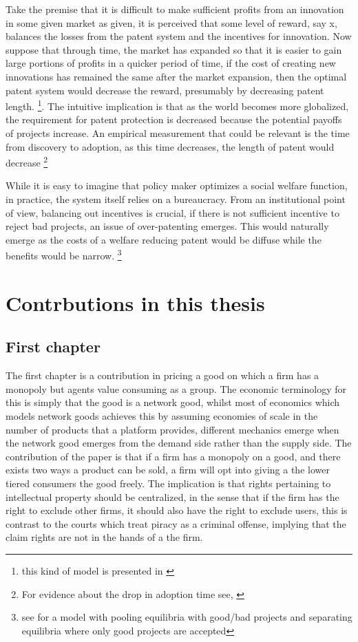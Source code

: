 \documentclass[12pt]{article}
\numberwithin{equation}{section}
\begin{document}
Take the premise that it is difficult to make sufficient profits from an innovation in some given market as given, it is perceived that some level of reward, say x, balances the losses from the patent system and the incentives for innovation. Now suppose that through time, the market has expanded so that it is easier to gain large portions of profits in a quicker period of time, if the cost of creating new innovations has remained the same after the market expansion, then the optimal patent system would decrease the reward, presumably by decreasing patent length. \footnote{this kind of model is presented in \cite{boldrin2009market} }. The intuitive implication is that as the world becomes more globalized, the requirement for patent protection is decreased because the potential payoffs of projects increase. An empirical measurement that could be relevant is the time from discovery to adoption, as this time decreases, the length of patent would decrease \footnote{For evidence about the drop in adoption time see, \cite{comin2006five}}

While it is easy to imagine that policy maker optimizes a social welfare function, in practice, the system itself relies on a bureaucracy. From an institutional point of view, balancing out incentives is crucial, if there is not sufficient incentive to reject bad projects, an issue of over-patenting emerges. This would naturally emerge as the costs of a welfare reducing patent would be diffuse while the benefits would be narrow. \footnote{see \cite{Caillaud2012} for a model with pooling equilibria with good/bad projects and separating equilibria where only good projects are accepted}

\section{Contrbutions in this thesis}

\subsection{First chapter}

The first chapter is a contribution in pricing a good on which a firm has a monopoly but agents value consuming as a group. The economic terminology for this is simply that the good is a network good, whilst most of economics which models network goods achieves this by assuming economies of scale in the number of products that a platform provides, different mechanics emerge when the network good emerges from the demand side rather than the supply side. The contribution of the paper is that if a firm has a monopoly on a good, and there exists two ways a product can be sold, a firm will opt into giving a the lower tiered consumers the good freely. The implication is that rights pertaining to intellectual property should be centralized, in the sense that if the firm has the right to exclude other firms, it should also have the right to exclude users, this is contrast to the courts which treat piracy as a criminal offense, implying that the claim rights are not in the hands of a the firm. 
\end{document}

